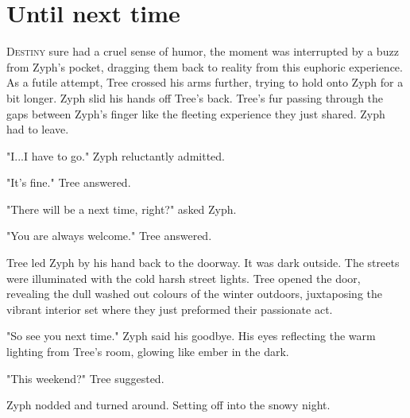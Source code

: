 \chapter{Until next time}

\lettrine{D}{estiny} sure had a cruel sense of humor, the moment was \mbox{interrupted} by a buzz from Zyph's pocket, dragging them back to reality from this euphoric experience. As a futile attempt, Tree crossed his arms further, trying to hold onto Zyph for a bit longer. Zyph slid his hands off Tree's back. Tree's fur passing through the gaps between Zyph's finger like the fleeting experience they just shared. Zyph had to leave.

"I...I have to go." Zyph reluctantly admitted.

"It's fine." Tree answered.

"There will be a next time, right?" asked Zyph.

"You are always welcome." Tree answered.

Tree led Zyph by his hand back to the doorway. It was dark outside. The streets were illuminated with the cold harsh street lights. Tree opened the door, revealing the dull washed out colours of the winter outdoors, juxtaposing the vibrant interior set where they just preformed their passionate act.

"So see you next time."  Zyph said his goodbye. His eyes reflecting the warm lighting from Tree's room, glowing like ember in the dark.

"This weekend?" Tree suggested.

Zyph nodded and turned around. Setting off into the snowy night.